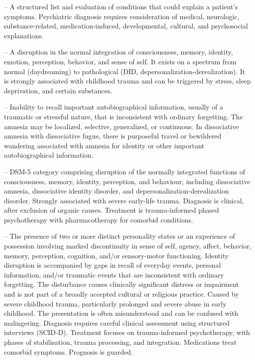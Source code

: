 -- A structured list and evaluation of conditions that could explain a patient’s symptoms. Psychiatric diagnosis requires consideration of medical, neurologic, substance-related, medication-induced, developmental, cultural, and psychosocial explanations.

-- A disruption in the normal integration of consciousness, memory, identity, emotion, perception, behavior, and sense of self. It exists on a spectrum from normal (daydreaming) to pathological (DID, depersonalization-derealization). It is strongly associated with childhood trauma and can be triggered by stress, sleep deprivation, and certain substances.

-- Inability to recall important autobiographical information, usually of a traumatic or stressful nature, that is inconsistent with ordinary forgetting. The amnesia may be localized, selective, generalized, or continuous. In dissociative amnesia with dissociative fugue, there is purposeful travel or bewildered wandering associated with amnesia for identity or other important autobiographical information.

-- DSM-5 category comprising disruption of the normally integrated functions of consciousness, memory, identity, perception, and behaviour, including dissociative amnesia, dissociative identity disorder, and depersonalization-derealization disorder. Strongly associated with severe early-life trauma. Diagnosis is clinical, after exclusion of organic causes. Treatment is trauma-informed phased psychotherapy with pharmacotherapy for comorbid conditions.

-- The presence of two or more distinct personality states or an experience of possession involving marked discontinuity in sense of self, agency, affect, behavior, memory, perception, cognition, and/or sensory-motor functioning. Identity disruption is accompanied by gaps in recall of everyday events, personal information, and/or traumatic events that are inconsistent with ordinary forgetting. The disturbance causes clinically significant distress or impairment and is not part of a broadly accepted cultural or religious practice. Caused by severe childhood trauma, particularly prolonged and severe abuse in early childhood. The presentation is often misunderstood and can be confused with malingering. Diagnosis requires careful clinical assessment using structured interviews (SCID-D). Treatment focuses on trauma-informed psychotherapy, with phases of stabilisation, trauma processing, and integration. Medications treat comorbid symptoms. Prognosis is guarded.

